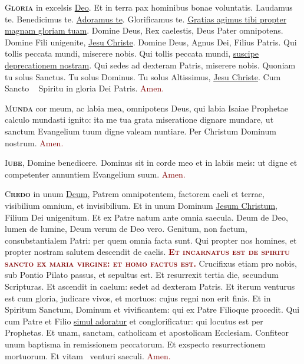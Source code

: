 \documentclass[12pt, landscape]{scrartcl}
\newcommand{\krzyz}{\textcolor{red}{\raisebox{-1mm}{\scalebox{1.5}{\ding{64}}}}}
\newcommand{\amen}{\textcolor{Maroon}{Amen.}}
\newcommand{\initial}[2]{\lettrine[lines=3]{\color{Maroon}#1}{\bfseries\color{Maroon}#2}}
\newcommand{\gap}{\vspace{0.65cm}}
\newcommand{\sklon}[1]{\ul{#1}}
\begin{document}
\thispagestyle{empty}

\pagecolor{fondpaille}
\color{darkgreen}
\large

\begin{center}

    \begin{minipage}[t]{0.29\linewidth}

        \vspace*{2.2cm}

        \initial{G}{loria} in excelsis \sklon{Deo}. Et in terra pax hominibus
        bonae voluntatis. Laudamus te. Benedicimus te. \sklon{Adoramus te}.
        Glorificamus te. \sklon{Gratias agimus tibi propter magnam gloriam
            tuam}. Domine Deus, Rex caelestis, Deus Pater omnipotens. Domine Fili
        unigenite, \sklon{Jesu Christe}. Domine Deus, Agnus Dei, Filius Patris.
        Qui tollis peccata mundi, miserere nobis. Qui tollis peccata mundi,
        \sklon{suscipe deprecationem nostram}. Qui sedes ad dexteram Patris,
        miserere nobis. Quoniam tu solus Sanctus. Tu solus Dominus. Tu solus
        Altissimus, \sklon{Jesu Christe}. Cum Sancto \krzyz~ Spiritu in gloria
        Dei Patris. \amen

        \gap

        \initial{M}{unda} cor meum, ac labia mea, omnipotens Deus, qui labia
        Isaiae Prophetae calculo mundasti ignito: ita me tua grata miseratione
        dignare mundare, ut sanctum Evangelium tuum digne valeam nuntiare. Per
        Christum Dominum nostrum. \amen

        \gap

        \initial{I}{ube}, Domine benedicere. Dominus sit in corde meo et in
        labiis meis: ut digne et competenter annuntiem Evangelium suum. \amen

        \gap

        \initial{C}{redo} in unum \sklon{Deum}, Patrem omnipotentem, factorem
        caeli et terrae, visibilium omnium, et invisibilium. Et in unum Dominum
        \sklon{Jesum Christum}, Filium Dei unigenitum. Et ex Patre natum ante
        omnia saecula. Deum de Deo, lumen de lumine, Deum verum de Deo vero.
        Genitum, non factum, consubstantialem Patri: per quem omnia facta sunt.
        Qui propter nos homines, et propter nostram salutem descendit de caelis.
        \textcolor{Maroon}{\bfseries\scshape Et incarnatus est de spiritu sancto
            ex maria virgine: et homo factus est.} Crucifixus etiam pro nobis, sub
        Pontio Pilato passus, et sepultus est. Et resurrexit tertia die,
        secundum Scripturas. Et ascendit in caelum: sedet ad dexteram Patris. Et
        iterum venturus est cum gloria, judicare vivos, et mortuos: cujus regni
        non erit finis. Et in Spiritum Sanctum, Dominum et vivificantem: qui ex
        Patre Filioque procedit. Qui cum Patre et Filio \sklon{simul adoratur}
        et conglorificatur: qui locutus est per Prophetas. Et unam, sanctam,
        catholicam et apostolicam Ecclesiam. Confiteor unum baptisma in
        remissionem peccatorum. Et exspecto resurrectionem mortuorum. Et vitam
        \krzyz~venturi saeculi.
        \amen


\end{minipage}
\end{center}
\end{document}
